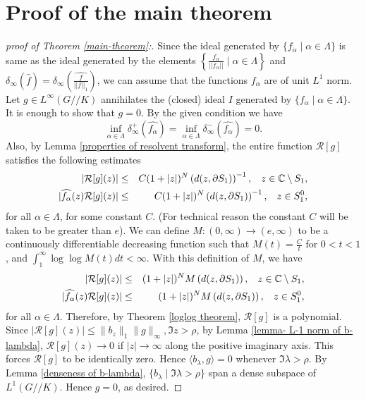 \documentclass[11pt,reqno]{amsart}
\theoremstyle{definition}
\theoremstyle{definition}
\numberwithin{equation}{section}
\begin{document}
\section{Proof of the main theorem}
\begin{proof}[proof of Theorem \ref{main-theorem}:]
Since the ideal generated by $\{f_\alpha\mid \alpha\in\Lambda\}$ is same as the ideal generated by the elements $\left\{\frac{f_\alpha}{||f_\alpha||}\mid \alpha\in\Lambda\right\}$ and $\delta_\infty(\widehat{f})=
\delta_\infty
\left({\widehat{\frac{f}{||f||_1}}}\right)$, we can assume that the functions $f_\alpha$ are of unit $L^1$ norm. Let $g\in L^\infty(G//K)$ annihilates the (closed) ideal $I$ generated by $\{f_\alpha\mid \alpha\in\Lambda\}$. It is enough to show that $g=0$. By the given condition we have
$$
\inf_{\alpha\in\Lambda}\delta^+_\infty(\widehat{f_\alpha})=\inf_{\alpha\in\Lambda}\delta^-_\infty(\widehat{f_\alpha})=0.
$$
 Also, by Lemma \ref{properties of resolvent transform}, the entire function $\mathcal{R}[g]$ satisfies the following estimates
\begin{eqnarray*}
|\mathcal{R}[g](z)|&\leq & C(1+|z|)^N\left(d(z,\partial S_1)\right)^{-1},
\hspace{3mm}z\in\mathbb{C}\setminus S_1,\\
|\widehat{f_\alpha}(z)\mathcal{R}[g](z)|&\leq & C(1+|z|)^N\left(d(z,\partial S_1)\right)^{-1},
\hspace{3mm}z\in S_1^0,
\end{eqnarray*}
for all $\alpha\in\Lambda$, for some constant $C$. (For technical reason the constant $C$ will be taken to be greater than $e$).
 We can define $M:(0,\infty)\rightarrow(e,\infty)$ to be a continuously differentiable decreasing function such that
$M(t)=\frac{C}{t}$ for $0<t< 1$, and  $\int_1^\infty\log\log M(t)dt<\infty$. With this definition of $M$, we  have 
\begin{eqnarray*}
|\mathcal{R}[g](z)|&\leq & (1+|z|)^NM\left(d(z,\partial S_1)\right),
\hspace{3mm}z\in\mathbb{C}\setminus S_1,\\
|\widehat{f_\alpha}(z)\mathcal{R}[g](z)|&\leq & (1+|z|)^NM\left(d(z,\partial S_1)\right),
\hspace{3mm}z\in S_1^0,
\end{eqnarray*}
for all $\alpha\in\Lambda$.
Therefore, by Theorem \ref{loglog theorem}, $\mathcal{R}[g]$ is a polynomial. Since $|\mathcal R[g](z)|\leq \|b_z\|_1 \|g\|_\infty, \Im z>\rho$,  by Lemma \ref{lemma- L-1 norm of b-lambda}, $\mathcal{R}[g](z)\rightarrow 0$ if $|z|\rightarrow\infty$ along the positive imaginary axis. This forces $\mathcal{R}[g]$ to be identically zero. Hence $\langle b_\lambda,g\rangle=0$ whenever $\Im\lambda>\rho$.  By Lemma \ref{denseness of b-lambda},  $\{b_\lambda\mid \Im\lambda>\rho\}$ span a dense subspace of $L^1(G//K)$. Hence $g=0$, as desired. 
\end{proof}  
\end{document}
